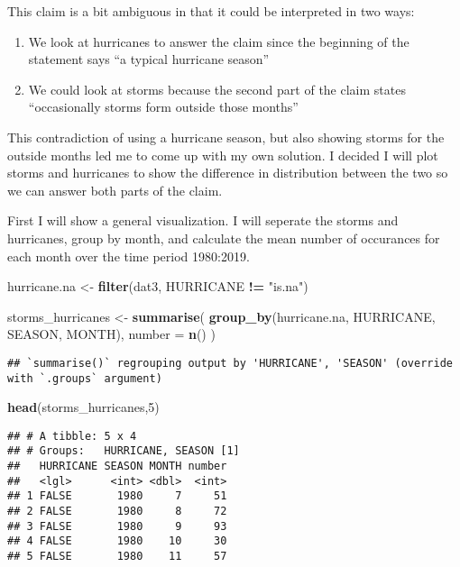 \documentclass[
]{article}
\newenvironment{Shaded}{\begin{snugshade}}{\end{snugshade}}
\newcommand{\DataTypeTok}[1]{\textcolor[rgb]{0.13,0.29,0.53}{#1}}
\newcommand{\DecValTok}[1]{\textcolor[rgb]{0.00,0.00,0.81}{#1}}
\newcommand{\KeywordTok}[1]{\textcolor[rgb]{0.13,0.29,0.53}{\textbf{#1}}}
\newcommand{\NormalTok}[1]{#1}
\newcommand{\OperatorTok}[1]{\textcolor[rgb]{0.81,0.36,0.00}{\textbf{#1}}}
\newcommand{\StringTok}[1]{\textcolor[rgb]{0.31,0.60,0.02}{#1}}
\providecommand{\tightlist}{%
  \setlength{\itemsep}{0pt}\setlength{\parskip}{0pt}}
\begin{document}
This claim is a bit ambiguous in that it could be interpreted in two
ways:

\begin{enumerate}
\def\labelenumi{\arabic{enumi})}
\tightlist
\item
  We look at hurricanes to answer the claim since the beginning of the
  statement says ``a typical hurricane season''
\item
  We could look at storms because the second part of the claim states
  ``occasionally storms form outside those months''
\end{enumerate}

This contradiction of using a hurricane season, but also showing storms
for the outside months led me to come up with my own solution. I decided
I will plot storms and hurricanes to show the difference in distribution
between the two so we can answer both parts of the claim.

First I will show a general visualization. I will seperate the storms
and hurricanes, group by month, and calculate the mean number of
occurances for each month over the time period 1980:2019.

\begin{Shaded}
\begin{Highlighting}[]
\NormalTok{hurricane.na <-}\StringTok{ }\KeywordTok{filter}\NormalTok{(dat3, HURRICANE }\OperatorTok{!=}\StringTok{ "is.na"}\NormalTok{)}

\NormalTok{storms_hurricanes <-}\StringTok{ }\KeywordTok{summarise}\NormalTok{(}
  \KeywordTok{group_by}\NormalTok{(hurricane.na, HURRICANE, SEASON, MONTH),}
  \DataTypeTok{number =} \KeywordTok{n}\NormalTok{()}
\NormalTok{)}
\end{Highlighting}
\end{Shaded}

\begin{verbatim}
## `summarise()` regrouping output by 'HURRICANE', 'SEASON' (override with `.groups` argument)
\end{verbatim}

\begin{Shaded}
\begin{Highlighting}[]
\KeywordTok{head}\NormalTok{(storms_hurricanes,}\DecValTok{5}\NormalTok{)}
\end{Highlighting}
\end{Shaded}

\begin{verbatim}
## # A tibble: 5 x 4
## # Groups:   HURRICANE, SEASON [1]
##   HURRICANE SEASON MONTH number
##   <lgl>      <int> <dbl>  <int>
## 1 FALSE       1980     7     51
## 2 FALSE       1980     8     72
## 3 FALSE       1980     9     93
## 4 FALSE       1980    10     30
## 5 FALSE       1980    11     57
\end{verbatim}
\end{document}

